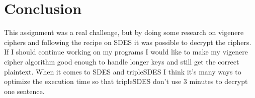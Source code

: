 \documentclass[12pt, letterpaper]{article}
\begin{document}
\section*{Conclusion}
This assignment was a real challenge, but by doing some research on vigenere ciphers and following the recipe on SDES it was possible to decrypt the ciphers. If I should continue working on my programs I would like to make my vigenere cipher algorithm good enough to handle longer keys and still get the correct plaintext. When it comes to SDES and tripleSDES I think it's many ways to optimize the execution time so that tripleSDES don't use 3 minutes to decrypt one sentence. 
\end{document}

